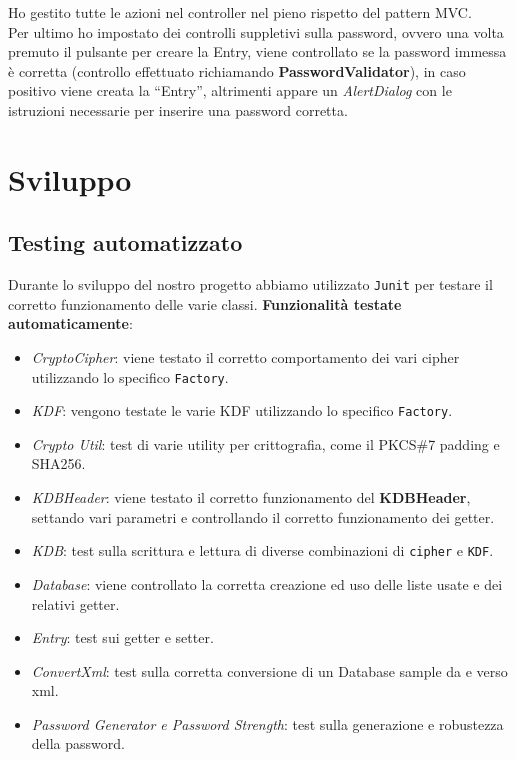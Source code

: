 \documentclass[a4paper,12pt]{report}
\begin{document}
Ho gestito tutte le azioni nel controller nel pieno rispetto del pattern MVC.\\

Per ultimo ho impostato dei controlli suppletivi sulla password, ovvero una volta premuto il pulsante per creare la Entry, viene controllato se la password immessa è corretta (controllo effettuato richiamando \textbf{PasswordValidator}), in caso positivo viene creata la “Entry”, altrimenti appare un \textit{AlertDialog} con le istruzioni necessarie per inserire una password corretta.


\chapter{Sviluppo}
\section{Testing automatizzato}

Durante lo sviluppo del nostro progetto abbiamo utilizzato \texttt{Junit} per
testare il corretto funzionamento delle varie classi.
\textbf{Funzionalità testate automaticamente}:
\begin{itemize}
  \item \textit{CryptoCipher}: viene testato il corretto comportamento dei vari cipher utilizzando lo specifico \texttt{Factory}.
  \item \textit{KDF}: vengono testate le varie KDF utilizzando lo specifico \texttt{Factory}.
  \item \textit{Crypto Util}: test di varie utility per crittografia, come il PKCS\#7 padding e SHA256.
  \item \textit{KDBHeader}: viene testato il corretto funzionamento del \textbf{KDBHeader}, settando vari parametri e controllando il corretto funzionamento dei getter.
  \item \textit{KDB}: test sulla scrittura e lettura di diverse combinazioni di \texttt{cipher} e \texttt{KDF}.
  \item \textit{Database}: viene controllato la corretta creazione ed uso delle liste usate e dei relativi getter.
  \item \textit{Entry}: test sui getter e setter.
  \item \textit{ConvertXml}: test sulla corretta conversione di un Database sample da e verso xml.
  \item \textit{Password Generator e Password Strength}: test sulla generazione e robustezza della password.
\end{itemize}
\end{document}
